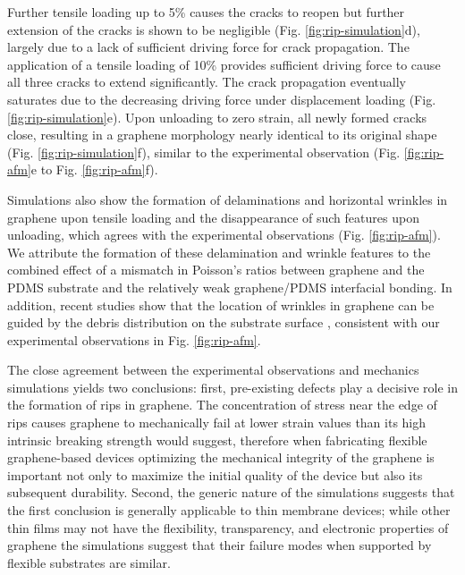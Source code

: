 \documentclass[edeposit,fullpage,draftthesis]{uiucthesis2009}
\begin{document}
        Further tensile loading up to 5\% causes the cracks to reopen but further
        extension of the cracks is shown to be negligible (Fig. \ref{fig:rip-simulation}d), largely due to a
        lack of sufficient driving force for crack propagation. The application of a
        tensile loading of 10\% provides sufficient driving force to cause all three
        cracks to extend significantly. The crack propagation eventually saturates due
        to the decreasing driving force under displacement loading (Fig. \ref{fig:rip-simulation}e). Upon
        unloading to zero strain, all newly formed cracks close, resulting in a
        graphene morphology nearly identical to its original shape (Fig. \ref{fig:rip-simulation}f), similar
        to the experimental observation (Fig. \ref{fig:rip-afm}e to Fig. \ref{fig:rip-afm}f).
        
        Simulations also show the formation of delaminations and horizontal wrinkles in
        graphene upon tensile loading and the disappearance of such features upon
        unloading, which agrees with the experimental observations (Fig. \ref{fig:rip-afm}). We
        attribute the formation of these delamination and wrinkle features to the
        combined effect of a mismatch in Poisson's ratios between graphene and the PDMS
        substrate and the relatively weak graphene/PDMS interfacial bonding. In
        addition, recent studies show that the location of wrinkles in graphene can be
        guided by the debris distribution on the substrate surface \cite{Zhu2014b},
        consistent with our experimental observations in Fig. \ref{fig:rip-afm}.
        
        The close agreement between the experimental observations and mechanics
        simulations yields two conclusions: first, pre-existing defects play a decisive
        role in the formation of rips in graphene. The concentration of stress near the
        edge of rips causes graphene to mechanically fail at lower strain values than
        its high intrinsic breaking strength would suggest, therefore when fabricating
        flexible graphene-based devices optimizing the mechanical integrity of the
        graphene is important not only to maximize the initial quality of the device
        but also its subsequent durability. Second, the generic nature of the
        simulations suggests that the first conclusion is generally applicable to thin
        membrane devices; while other thin films may not have the flexibility,
        transparency, and electronic properties of graphene the simulations suggest
        that their failure modes when supported by flexible substrates are similar.
\end{document}
